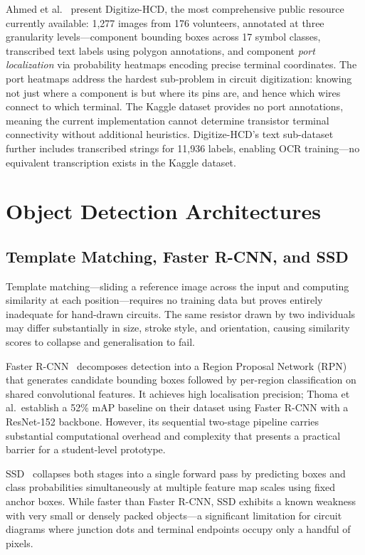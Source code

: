 Ahmed et al.~\cite{ahmed2025} present Digitize-HCD, the most comprehensive public resource currently available: 1,277 images from 176 volunteers, annotated at three granularity levels—component bounding boxes across 17 symbol classes, transcribed text labels using polygon annotations, and component \emph{port localization} via probability heatmaps encoding precise terminal coordinates. The port heatmaps address the hardest sub-problem in circuit digitization: knowing not just where a component is but where its pins are, and hence which wires connect to which terminal. The Kaggle dataset provides no port annotations, meaning the current implementation cannot determine transistor terminal connectivity without additional heuristics. Digitize-HCD's text sub-dataset further includes transcribed strings for 11,936 labels, enabling OCR training—no equivalent transcription exists in the Kaggle dataset.

\section{Object Detection Architectures}

\subsection{Template Matching, Faster R-CNN, and SSD}

Template matching—sliding a reference image across the input and computing similarity at each position—requires no training data but proves entirely inadequate for hand-drawn circuits. The same resistor drawn by two individuals may differ substantially in size, stroke style, and orientation, causing similarity scores to collapse and generalisation to fail.

Faster R-CNN~\cite{ren2015} decomposes detection into a Region Proposal Network (RPN) that generates candidate bounding boxes followed by per-region classification on shared convolutional features. It achieves high localisation precision; Thoma et al.\ establish a 52\% mAP baseline on their dataset using Faster R-CNN with a ResNet-152 backbone. However, its sequential two-stage pipeline carries substantial computational overhead and complexity that presents a practical barrier for a student-level prototype.

SSD~\cite{liu2016} collapses both stages into a single forward pass by predicting boxes and class probabilities simultaneously at multiple feature map scales using fixed anchor boxes. While faster than Faster R-CNN, SSD exhibits a known weakness with very small or densely packed objects—a significant limitation for circuit diagrams where junction dots and terminal endpoints occupy only a handful of pixels.

